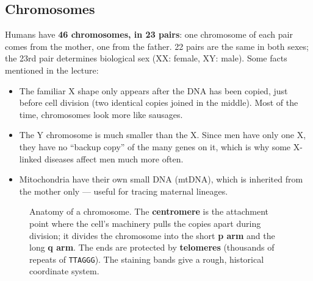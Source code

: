 \documentclass[11pt, oneside]{book}
\newcommand{\seq}[1]{\texttt{#1}}
\let\originalsubsection\subsection
\renewcommand{\subsection}{\Needspace{6\baselineskip}\originalsubsection}
\begin{document}
\subsection{Chromosomes}

Humans have \textbf{46 chromosomes, in 23 pairs}: one chromosome of each
pair comes from the mother, one from the father. 22 pairs are the same in
both sexes; the 23rd pair determines biological sex (XX: female, XY: male).
Some facts mentioned in the lecture:
\begin{itemize}
  \item The familiar X shape only appears after the DNA has been copied, just
    before cell division (two identical copies joined in the middle). Most of
    the time, chromosomes look more like sausages.
  \item The Y chromosome is much smaller than the X. Since men have only one
    X, they have no ``backup copy'' of the many genes on it, which is why
    some X-linked diseases affect men much more often.
  \item Mitochondria have their own small DNA (mtDNA), which is inherited from
    the mother only --- useful for tracing maternal lineages.
\end{itemize}

\begin{figure}[htbp]
\centering
{}
\caption{Anatomy of a chromosome. The \textbf{centromere} is the attachment
point where the cell's machinery pulls the copies apart during division; it
divides the chromosome into the short \textbf{p arm} and the long \textbf{q
arm}. The ends are protected by \textbf{telomeres} (thousands of repeats of
\seq{TTAGGG}). The staining bands give a rough, historical coordinate system.}
\label{fig:chromosome}
\end{figure}
\end{document}
